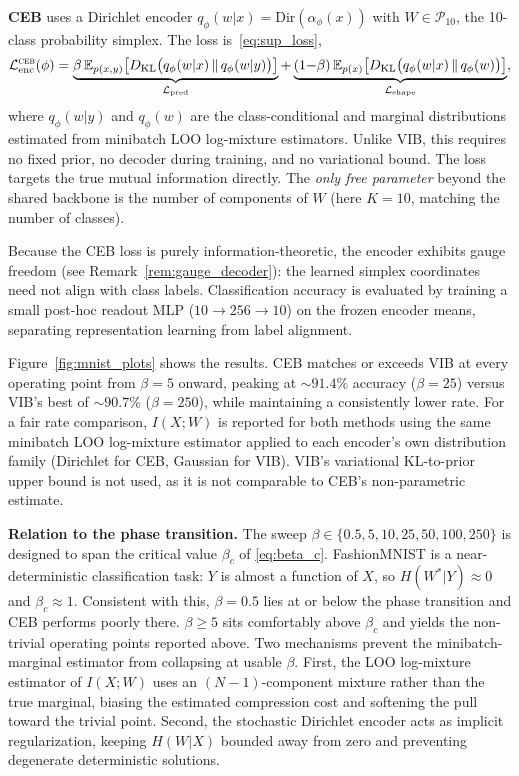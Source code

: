 \documentclass[11pt]{article}
\begin{document}
\textbf{CEB} uses a Dirichlet encoder
$q_\phi(w|x)=\mathrm{Dir}(\alpha_\phi(x))$ with
$W\in\mathcal{P}_{10}$, the 10-class probability simplex.
The loss is~\eqref{eq:sup_loss},
\begin{align}
    \mathcal{L}_{\mathrm{enc}}^{\text{\textsc{ceb}}}(\phi)
    = \underbrace{\beta\,\mathbb{E}_{p(x,y)}\!\left[D_{\mathrm{KL}}
    \bigl(q_\phi(w|x)\,\|\,q_\phi(w|y)\bigr)\right]}_{\mathcal{L}_{\mathrm{pred}}}
    + \underbrace{(1{-}\beta)\,\mathbb{E}_{p(x)}\!\left[D_{\mathrm{KL}}
    \bigl(q_\phi(w|x)\,\|\,q_\phi(w)\bigr)\right]}_{\mathcal{L}_{\mathrm{shape}}},
\end{align}
where $q_\phi(w|y)$ and $q_\phi(w)$ are the class-conditional and
marginal distributions estimated from minibatch LOO log-mixture
estimators.
Unlike VIB, this requires no fixed prior, no decoder during
training, and no variational bound. The loss targets the true mutual
information directly.
The \emph{only free parameter} beyond the shared backbone is the
number of components of $W$ (here $K{=}10$, matching the number of
classes).

Because the CEB loss is purely information-theoretic, the encoder
exhibits gauge freedom (see Remark~\ref{rem:gauge_decoder}): the learned
simplex coordinates need not align with class labels.
Classification accuracy is evaluated by training a small post-hoc
readout MLP ($10\to 256\to 10$) on the frozen encoder means, separating representation learning from
label alignment.

Figure~\ref{fig:mnist_plots} shows the results.
CEB matches or exceeds VIB at every operating point from $\beta{=}5$
onward, peaking at ${\sim}91.4\%$ accuracy ($\beta{=}25$) versus
VIB's best of ${\sim}90.7\%$ ($\beta{=}250$), while maintaining a
consistently lower rate.
For a fair rate comparison, $I(X;W)$ is reported for both methods
using the same minibatch LOO log-mixture estimator applied to each
encoder's own distribution family (Dirichlet for CEB, Gaussian for
VIB). VIB's variational KL-to-prior upper bound is not used, as it
is not comparable to CEB's non-parametric estimate.

\medskip
\noindent\textbf{Relation to the phase transition.}
The sweep $\beta\in\{0.5,5,10,25,50,100,250\}$ is designed to span
the critical value $\beta_c$ of \eqref{eq:beta_c}.
FashionMNIST is a near-deterministic classification task: $Y$ is
almost a function of $X$, so $H(W^*|Y)\approx 0$ and
$\beta_c\approx 1$.
Consistent with this, $\beta=0.5$ lies at or below the phase
transition and CEB performs poorly there. $\beta\geq 5$ sits
comfortably above $\beta_c$ and yields the non-trivial operating
points reported above.
Two mechanisms prevent the minibatch-marginal estimator from
collapsing at usable $\beta$.
First, the LOO log-mixture estimator of $I(X;W)$ uses an
$(N{-}1)$-component mixture rather than the true marginal, biasing
the estimated compression cost and softening the pull toward the
trivial point.
Second, the stochastic Dirichlet encoder acts as implicit
regularization, keeping $H(W|X)$ bounded away from zero and
preventing degenerate deterministic solutions.
\end{document}
